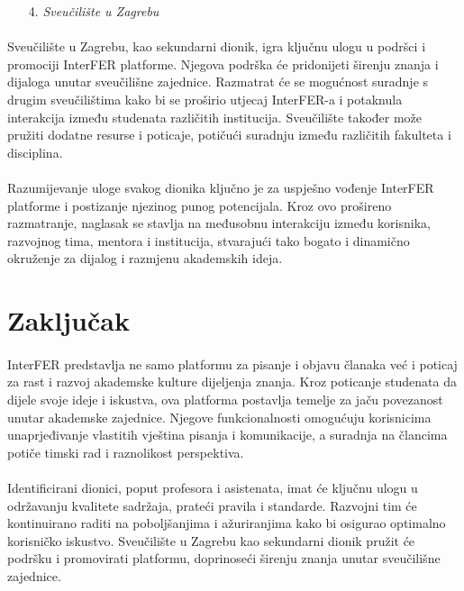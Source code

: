 \begin{enumerate}
	\item[4.] \textit{Sveučilište u Zagrebu}
\end{enumerate}

\paragraph{}
Sveučilište u Zagrebu, kao sekundarni dionik, igra ključnu ulogu u podršci i promociji InterFER platforme. Njegova podrška će pridonijeti širenju znanja i dijaloga unutar sveučilišne zajednice. Razmatrat će se mogućnost suradnje s drugim sveučilištima kako bi se proširio utjecaj InterFER-a i potaknula interakcija između studenata različitih institucija. Sveučilište također može pružiti dodatne resurse i poticaje, potičući suradnju između različitih fakulteta i disciplina.

\paragraph{}
Razumijevanje uloge svakog dionika ključno je za uspješno vođenje InterFER platforme i postizanje njezinog punog potencijala. Kroz ovo prošireno razmatranje, naglasak se stavlja na međusobnu interakciju između korisnika, razvojnog tima, mentora i institucija, stvarajući tako bogato i dinamično okruženje za dijalog i razmjenu akademskih ideja.

\section{Zaključak}

\paragraph{}
InterFER predstavlja ne samo platformu za pisanje i objavu članaka već i 
poticaj za rast i razvoj akademske kulture dijeljenja znanja. Kroz 
poticanje studenata da dijele svoje ideje i iskustva, ova platforma 
postavlja temelje za jaču povezanost unutar akademske zajednice. Njegove
funkcionalnosti omogućuju korisnicima unaprjeđivanje vlastitih vještina 
pisanja i komunikacije, a suradnja na člancima potiče timski rad i 
raznolikost perspektiva.

\paragraph{}
Identificirani dionici, poput profesora i asistenata, imat će ključnu 
ulogu u održavanju kvalitete sadržaja, prateći pravila i standarde. 
Razvojni tim će kontinuirano raditi na poboljšanjima i ažuriranjima kako 
bi osigurao optimalno korisničko iskustvo. Sveučilište u Zagrebu kao 
sekundarni dionik pružit će podršku i promovirati platformu, doprinoseći 
širenju znanja unutar sveučilišne zajednice.

